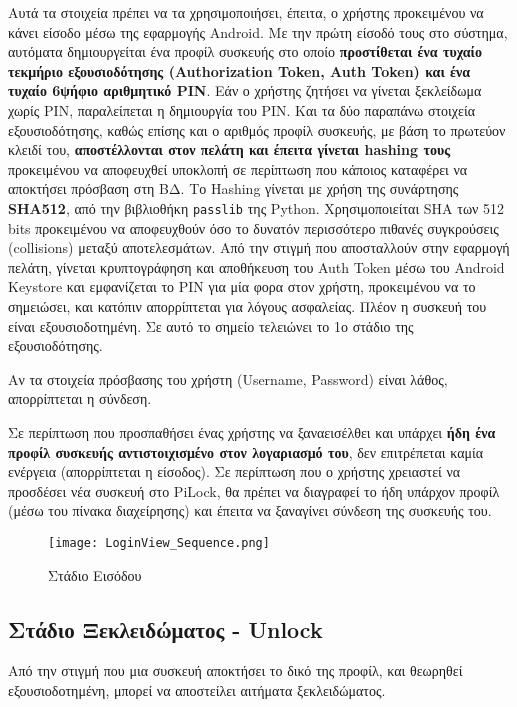 		Αυτά τα στοιχεία πρέπει να τα χρησιμοποιήσει, έπειτα, ο χρήστης προκειμένου να κάνει είσοδο μέσω της εφαρμογής Android. Με την πρώτη είσοδό τους στο σύστημα, αυτόματα δημιουργείται ένα προφίλ συσκευής στο οποίο \textbf{προστίθεται ένα τυχαίο τεκμήριο εξουσιοδότησης (Authorization Token, Auth Token) και ένα τυχαίο 6ψήφιο αριθμητικό PIN}. Εάν ο χρήστης ζητήσει να γίνεται ξεκλείδωμα χωρίς PIN, παραλείπεται η δημιουργία του PIN. Και τα δύο παραπάνω στοιχεία εξουσιοδότησης, καθώς επίσης και ο αριθμός προφίλ συσκευής, με βάση το πρωτεύον κλειδί του, \textbf{αποστέλλονται στον πελάτη και έπειτα γίνεται hashing τους} προκειμένου να αποφευχθεί υποκλοπή σε περίπτωση που κάποιος καταφέρει να αποκτήσει πρόσβαση στη ΒΔ. Το Hashing γίνεται με χρήση της συνάρτησης \textbf{SHA512}, από την βιβλιοθήκη \verb|passlib| της Python. Χρησιμοποιείται SHA των 512 bits προκειμένου να αποφευχθούν όσο το δυνατόν περισσότερο πιθανές συγκρούσεις (collisions) μεταξύ αποτελεσμάτων. Από την στιγμή που αποσταλλούν στην εφαρμογή πελάτη, γίνεται κρυπτογράφηση και αποθήκευση του Auth Token μέσω του Android Keystore και εμφανίζεται το PIN για μία φορα στον χρήστη, προκειμένου να το σημειώσει, και κατόπιν απορρίπτεται για λόγους ασφαλείας. Πλέον η συσκευή του είναι εξουσιοδοτημένη. Σε αυτό το σημείο τελειώνει το 1ο στάδιο της εξουσιοδότησης.

		Αν τα στοιχεία πρόσβασης του χρήστη (Username, Password) είναι λάθος, απορρίπτεται η σύνδεση.

		Σε περίπτωση που προσπαθήσει ένας χρήστης να ξαναεισέλθει και υπάρχει \textbf{ήδη ένα προφίλ συσκευής αντιστοιχισμένο στον λογαριασμό του}, δεν επιτρέπεται καμία ενέργεια (απορρίπτεται η είσοδος). Σε περίπτωση που ο χρήστης χρειαστεί να προσδέσει νέα συσκευή στο PiLock, θα πρέπει να διαγραφεί το ήδη υπάρχον προφίλ (μέσω του πίνακα διαχείρησης) και έπειτα να ξαναγίνει σύνδεση της συσκευής του.

		\begin{figure}[h]
			\centering
				\texttt{[image: LoginView\_Sequence.png]}
			\caption{Στάδιο Εισόδου}
			\label{fig:login_stage}
		\end{figure}

	\subsection{Στάδιο Ξεκλειδώματος - Unlock}
		Από την στιγμή που μια συσκευή αποκτήσει το δικό της προφίλ, και θεωρηθεί εξουσιοδοτημένη, μπορεί να αποστείλει αιτήματα ξεκλειδώματος.

